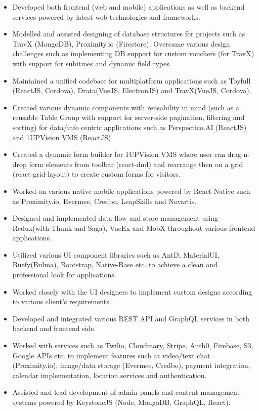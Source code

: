 \documentclass[10pt,a4paper,ragged2e]{maltacv}
\begin{document}
\begin{itemize}
  \item Developed both frontend (web and mobile) applications as well as backend services powered by latest web technologies and frameworks.
  \item Modelled and assisted designing of database structures for projects such as TravX (MongoDB), Proximity.io (Firestore). Overcame various design challenges such as implementing DB support for custom vouchers (for TravX) with support for subitmes and dynamic field types. 
  \item Maintained a unified codebase for multiplatform applications such as Toyfull (ReactJS, Cordova), Drata(VueJS, ElectronJS) and TravX(VueJS, Cordova).
  \item Created various dynamic components with reusability in mind (such as a reusable Table Group with support for server-side pagination, filtering and sorting) for data/info centric applications such as Perspectico.AI (ReactJS) and 1UPVision VMS (ReactJS)
  \item Created a dynamic form builder for 1UPVision VMS where user can drag-n-drop form elements from toolbar (react-dnd) and rearrange then on a grid (react-grid-layout) to create custom forms for visitors.
  \item Worked on various native mobile applications powered by React-Native such as Proximity.io, Evermee, Credbo, LeapSkills and Novartis. 
  \item Designed and implemented data flow and store management using Redux(with Thunk and Saga), VueEx and MobX throughout various frontend applications.
  \item Utilized various UI component libraries such as AntD, MaterialUI, Buefy(Bulma), Bootstrap, Native-Base etc. to achieve a clean and professional look for applications. 
  \item Worked closely with the UI designers to implement custom designs according to various client's requirements.
  \item Developed and integrated various REST API and GraphQL services in both backend and frontend side.
  \item Worked with services such as Twilio, Cloudinary, Stripe, Auth0, Firebase, S3, Google APIs etc. to implement features such at video/text chat (Proximity.io), image/data storage (Evermee, Credbo), payment integration, calendar implementation, location services and authentication.  
  \item Assisted and lead development of admin panels and content management systems powered by KeystoneJS (Node, MongoDB, GraphQL, React).
\end{itemize}
\end{document}
